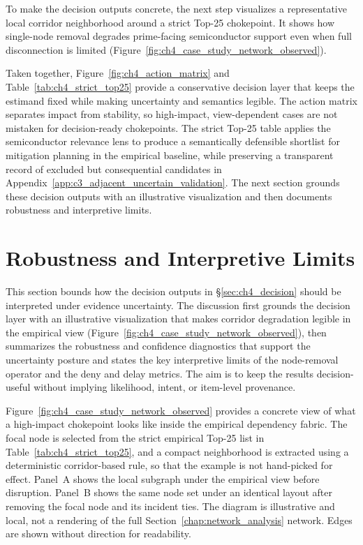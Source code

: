 To make the decision outputs concrete, the next step visualizes a representative local corridor neighborhood around a strict Top-25 chokepoint. It shows how single-node removal degrades prime-facing semiconductor support even when full disconnection is limited (Figure~\ref{fig:ch4_case_study_network_observed}).

Taken together, Figure~\ref{fig:ch4_action_matrix} and Table~\ref{tab:ch4_strict_top25} provide a conservative decision layer that keeps the estimand fixed while making uncertainty and semantics legible. The action matrix separates impact from stability, so high-impact, view-dependent cases are not mistaken for decision-ready chokepoints. The strict Top-25 table applies the semiconductor relevance lens to produce a semantically defensible shortlist for mitigation planning in the empirical baseline, while preserving a transparent record of excluded but consequential candidates in Appendix~\ref{app:c3_adjacent_uncertain_validation}. The next section grounds these decision outputs with an illustrative visualization and then documents robustness and interpretive limits.

\section{Robustness and Interpretive Limits}
\label{sec:ch4_robustness}

This section bounds how the decision outputs in \S\ref{sec:ch4_decision} should be interpreted under evidence uncertainty. The discussion first grounds the decision layer with an illustrative visualization that makes corridor degradation legible in the empirical view (Figure~\ref{fig:ch4_case_study_network_observed}), then summarizes the robustness and confidence diagnostics that support the uncertainty posture and states the key interpretive limits of the node-removal operator and the deny and delay metrics. The aim is to keep the results decision-useful without implying likelihood, intent, or item-level provenance.

Figure~\ref{fig:ch4_case_study_network_observed} provides a concrete view of what a high-impact chokepoint looks like inside the empirical dependency fabric. The focal node is selected from the strict empirical Top-25 list in Table~\ref{tab:ch4_strict_top25}, and a compact neighborhood is extracted using a deterministic corridor-based rule, so that the example is not hand-picked for effect. Panel~A shows the local subgraph under the empirical view before disruption. Panel~B shows the same node set under an identical layout after removing the focal node and its incident ties. The diagram is illustrative and local, not a rendering of the full Section~\ref{chap:network_analysis} network. Edges are shown without direction for readability.

